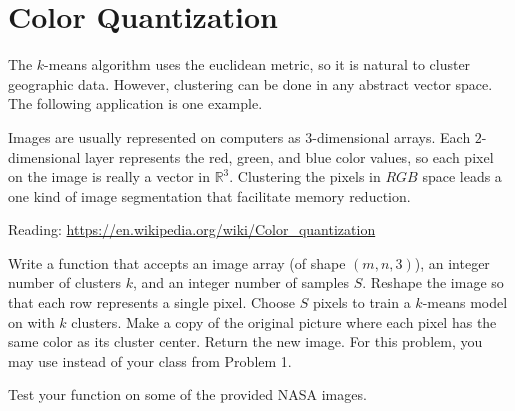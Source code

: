 \section*{Color Quantization} %

The $k$-means algorithm uses the euclidean metric, so it is natural to cluster geographic data.
However, clustering can be done in any abstract vector space.
The following application is one example.

Images are usually represented on computers as $3$-dimensional arrays.
Each $2$-dimensional layer represents the red, green, and blue color values, so each pixel on the image is really a vector in $\mathbb{R}^3$.
Clustering the pixels in $RGB$ space leads a one kind of image segmentation that facilitate memory reduction.

Reading: \url{https://en.wikipedia.org/wiki/Color_quantization}

\begin{problem}
Write a function that accepts an image array (of shape $(m,n,3)$), an integer number of clusters $k$, and an integer number of samples $S$.
Reshape the image so that each row represents a single pixel.
Choose $S$ pixels to train a $k$-means model on with $k$ clusters.
Make a copy of the original picture where each pixel has the same color as its cluster center.
Return the new image.
For this problem, you may use  instead of your  class from Problem 1.

Test your function on some of the provided NASA images.
\end{problem}

